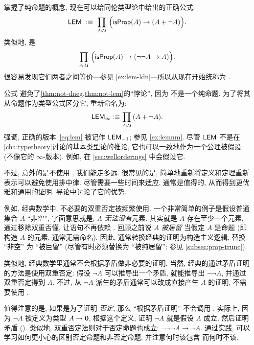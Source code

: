 %
%
掌握了纯命题的概念, 现在可以给同伦类型论中给出的正确公式:
%
%
%
\begin{equation}
    \label{eq:lem}
    \LEM{}\;\defeq\;
    \prd{A:\UU} \Big(\isprop(A) \to (A + \neg A)\Big).
\end{equation}
类似地, %
%
%
%
是
\begin{equation}
    \label{eq:ldn}
    \prd{A:\UU} \Big(\isprop(A) \to (\neg\neg A \to A)\Big).
\end{equation}
很容易发现它们两者之间等价---参见 \cref{ex:lem-ldn}---所以从现在开始统称为 \LEM{}.

公式 \LEM{} 避免了\cref{thm:not-dneg,thm:not-lem}的``悖论'', 因为 \bool 不是一个纯命题.
为了将其从命题作为类型公式区分它, 重新命名为:
\begin{equation*}
    \LEM\infty \defeq \prd{A:\UU} (A + \neg A).
\end{equation*}
强调, 正确的版本~\eqref{eq:lem}
被记作 $\mathsf{LEM}_{-1}$;
参见 \cref{ex:lemnm}.
尽管 $\mathsf{LEM}_{}$ 不是在 \cref{cha:typetheory}讨论的基本类型论的推论, 它也可以一致地作为一个公理被假设 (不像它的 $\infty$-版本).
例如, 在 \cref{sec:wellorderings} 中会假设它.

不过, 意外的是不使用 \LEM{}, 我们能走多远.
很常见的是, 简单地重新将定义和定理重新表示可以避免使用排中律.
尽管需要一些时间来适应, 通常是值得的, 从而得到更优雅和通用的证明.
导论中讨论了它的优势.

例如, 经典数学中, 不必要的双重否定被频繁使用.
一个非常简单的例子是假设普通集合 $A$ ``非空'', 字面意思就是, $A$ \emph{无法}\emph{没有}元素.
其实就是 $A$  存在至少一个元素, 通过移除双重否懂, 让语句不再依赖 \LEM{}.
回顾之前说 $A$ \emph{被居留}%
%
当假定 $A$ 是命题 (即构造 $A$ 的元素, 通常无需命名).
因此, 通常转换经典的证明为构造主义逻辑, 替换 ``非空'' 为 ``被巨留'' (尽管有时必须替换为 ``被纯居留''; 参见 \cref{subsec:prop-trunc}).

类似地, 经典数学里通常不会根据矛盾做非必要的证明.
%
当然, 经典的通过矛盾证明的方法是使用双重否定: 假设 $\neg A$ 可以推导出一个矛盾, 就能推导出 $\neg \neg A$, 并通过双重否定得到 $A$.
不过, 从 $\neg A$ 派生的矛盾通常可以改成直接产生 $A$ 的证明, 不需要使用 \LEM{}.

值得注意的是, 如果是为了证明 \emph{否定}, 那么 ``根据矛盾证明'' 不会调用 \LEM{}.
实际上, 因为 $\neg A$ 被定义为类型 $A\to\mathbf{0}$, 根据这个定义, 证明 $\neg A$ 就是假设 $A$ 成立, 然后证明矛盾 (\emptyt).
类似地, 双重否定法则对于否定命题也成立: $\neg\neg\neg A \to \neg A$.
通过实践, 可以学习如何更小心的区别否定命题和非否定命题, 并注意何时该包含 \LEM{} 而何时不该.

